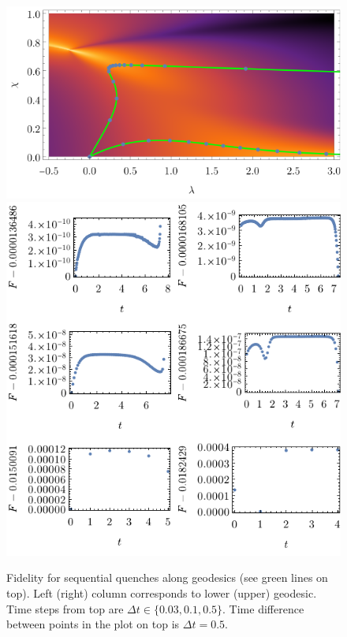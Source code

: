 
\begin{figure}[H]
    \centering
    \includegraphics[scale=1.2]{../img/bg123.pdf}
    \includegraphics[scale=1.2]{../img/plotsFidelityQuenches.pdf}
    \caption{Fidelity for sequential quenches along geodesics (see green lines on top). Left (right) column corresponds to lower (upper) geodesic. Time steps from top are $\Delta t\in \{0.03,0.1,0.5\}$. Time difference between points in the plot on top is $\Delta t=0.5$.}
    \label{fig:plotsFidelityQuenches}    
\end{figure}


